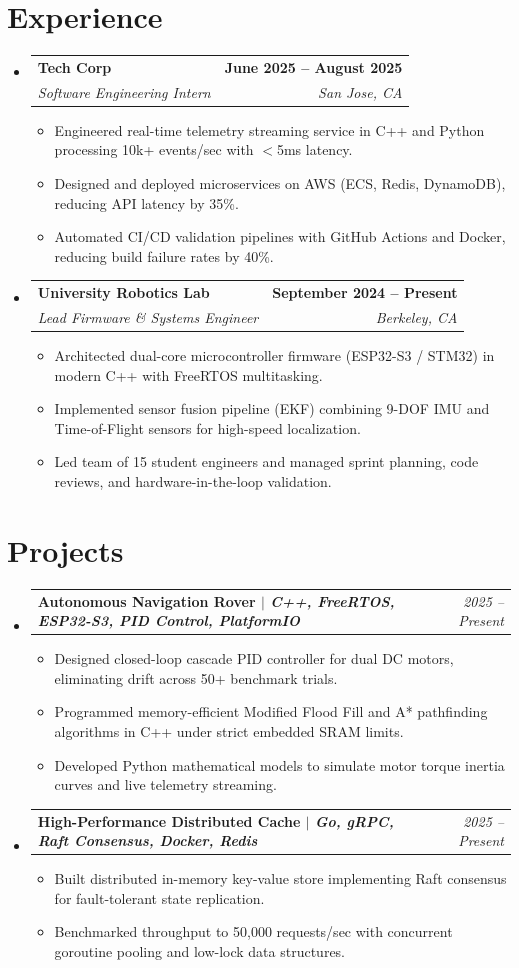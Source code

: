 \documentclass[letterpaper,10pt]{article}
\makeatletter
\newcommand{\resumeItem}[1]{
  \item\small{
    {#1 \vspace{-2pt}}
  }
}
\newcommand{\resumeSubheading}[4]{
  \vspace{-2pt}\item
    \begin{tabular*}{0.98\textwidth}[t]{l@{\extracolsep{\fill}}r}
      \textbf{#1} & \textbf{\small #2} \\
      \textit{\small#3} & \textit{\small #4} \\
    \end{tabular*}\vspace{-6pt}
}
\newcommand{\resumeProjectHeading}[2]{
  \vspace{-2pt}\item
    \begin{tabular*}{0.98\textwidth}{l@{\extracolsep{\fill}}r}
      \textbf{\small #1} & \textit{\small #2} \\
    \end{tabular*}\vspace{-6pt}
}
\newcommand{\resumeSubHeadingListStart}{\begin{itemize}[leftmargin=*,label={}]}
\newcommand{\resumeSubHeadingListEnd}{\end{itemize}\vspace{-6pt}}
\newcommand{\resumeItemListStart}{\begin{itemize}[leftmargin=*,label=\textbullet,itemsep=-2pt,topsep=1pt,parsep=0pt,partopsep=0pt]}
\newcommand{\resumeItemListEnd}{\end{itemize}\vspace{-3pt}}
\makeatother
\begin{document}
\section{Experience}
  \resumeSubHeadingListStart

    \resumeSubheading
      {Tech Corp}{June 2025 -- August 2025}
      {Software Engineering Intern}{San Jose, CA}
      \resumeItemListStart
        \resumeItem{Engineered real-time telemetry streaming service in C++ and Python processing 10k+ events/sec with $<$5ms latency.}
        \resumeItem{Designed and deployed microservices on AWS (ECS, Redis, DynamoDB), reducing API latency by 35\%.}
        \resumeItem{Automated CI/CD validation pipelines with GitHub Actions and Docker, reducing build failure rates by 40\%.}
      \resumeItemListEnd

    \resumeSubheading
      {University Robotics Lab}{September 2024 -- Present}
      {Lead Firmware \& Systems Engineer}{Berkeley, CA}
      \resumeItemListStart
        \resumeItem{Architected dual-core microcontroller firmware (ESP32-S3 / STM32) in modern C++ with FreeRTOS multitasking.}
        \resumeItem{Implemented sensor fusion pipeline (EKF) combining 9-DOF IMU and Time-of-Flight sensors for high-speed localization.}
        \resumeItem{Led team of 15 student engineers and managed sprint planning, code reviews, and hardware-in-the-loop validation.}
      \resumeItemListEnd

  \resumeSubHeadingListEnd

\section{Projects}
    \resumeSubHeadingListStart
      \resumeProjectHeading
          {\textbf{Autonomous Navigation Rover} $|$ \emph{C++, FreeRTOS, ESP32-S3, PID Control, PlatformIO}}{2025 -- Present}
          \resumeItemListStart
            \resumeItem{Designed closed-loop cascade PID controller for dual DC motors, eliminating drift across 50+ benchmark trials.}
            \resumeItem{Programmed memory-efficient Modified Flood Fill and A* pathfinding algorithms in C++ under strict embedded SRAM limits.}
            \resumeItem{Developed Python mathematical models to simulate motor torque inertia curves and live telemetry streaming.}
          \resumeItemListEnd

      \resumeProjectHeading
          {\textbf{High-Performance Distributed Cache} $|$ \emph{Go, gRPC, Raft Consensus, Docker, Redis}}{2025 -- Present}
          \resumeItemListStart
            \resumeItem{Built distributed in-memory key-value store implementing Raft consensus for fault-tolerant state replication.}
            \resumeItem{Benchmarked throughput to 50,000 requests/sec with concurrent goroutine pooling and low-lock data structures.}
          \resumeItemListEnd
    \resumeSubHeadingListEnd
\end{document}
